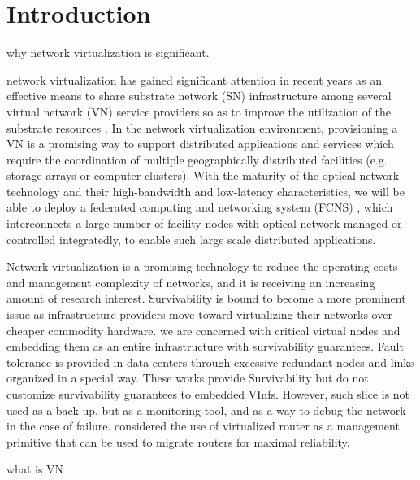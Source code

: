 
\section{Introduction}
\label{sec:Introduction}
why network virtualization is significant.

network virtualization has gained significant attention in recent years as an effective means to share substrate network (SN) infrastructure among several virtual network (VN) service providers so as to improve the utilization of the substrate resources \cite{armbrust2009above,yu2008rethinking}. In the network virtualization environment, provisioning a VN is a promising way to support distributed applications and services which require the coordination of multiple geographically distributed facilities (e.g. storage arrays or computer clusters). With the maturity of the optical network technology and their high-bandwidth and low-latency characteristics, we will be able to deploy a federated computing and networking system (FCNS) \cite{zhang2013effective,papagianni2013optimal}, which interconnects a large number of facility nodes with optical network managed or controlled integratedly, to enable such large scale distributed applications.

Network virtualization is a promising technology to reduce the operating costs and management complexity of networks, and it is receiving an increasing amount of research interest\cite{chowdhury2009network}. Survivability is bound to become a more prominent issue as infrastructure providers move toward virtualizing their networks over cheaper commodity hardware\cite{bhatia2008trellis}. we are concerned with critical virtual nodes and embedding them as an entire infrastructure with survivability guarantees. Fault tolerance is provided in data centers \cite{guo2009bcube} through excessive redundant nodes and links organized in a special way. These works provide Survivability but do not customize survivability guarantees to embedded VInfs. However, such slice is not used as a back-up, but as a monitoring tool, and as a way to debug
the network in the case of failure.\cite{wang2008virtual} considered the use
of virtualized router as a management primitive that can be used to migrate routers for maximal reliability.

what is VN

